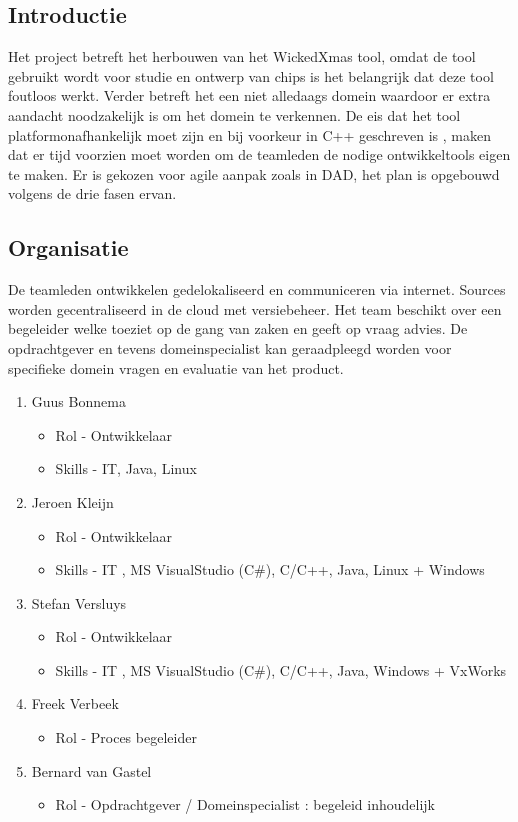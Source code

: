 
\subsection{Introductie}
Het project betreft het herbouwen van het WickedXmas tool, omdat de tool gebruikt wordt voor studie
en ontwerp van chips is het belangrijk dat deze tool foutloos werkt. Verder betreft het een niet
alledaags domein waardoor er extra aandacht noodzakelijk is om het domein te verkennen. De eis dat
het tool platformonafhankelijk moet zijn en bij voorkeur in C++ geschreven is , maken dat er tijd
voorzien moet worden om de teamleden de nodige ontwikkeltools eigen te maken.
Er is gekozen voor agile aanpak zoals in DAD, het plan is opgebouwd volgens de
drie fasen ervan.

\subsection{Organisatie}
 De teamleden ontwikkelen gedelokaliseerd en communiceren via internet. Sources worden gecentraliseerd
 in de cloud met versiebeheer. Het team beschikt over een begeleider welke toeziet op de gang van zaken
 en geeft op vraag advies. De opdrachtgever en tevens domeinspecialist kan geraadpleegd worden voor
 specifieke domein vragen en evaluatie van het product.
 \begin{enumerate}
 	\item Guus Bonnema
 	\begin{itemize}
		\item Rol - Ontwikkelaar
		\item Skills - IT, Java, Linux
	\end{itemize}
 	\item Jeroen Kleijn
 	\begin{itemize}
		\item Rol - Ontwikkelaar
		\item Skills - IT , MS VisualStudio (C\#), C/C++, Java, Linux + Windows
	\end{itemize}
 	\item Stefan Versluys
 	\begin{itemize}
		\item Rol - Ontwikkelaar
		\item Skills - IT , MS VisualStudio (C\#), C/C++, Java, Windows + VxWorks
	\end{itemize}
	\item Freek Verbeek
	\begin{itemize}
		\item Rol - Proces begeleider
	\end{itemize}
	\item Bernard van Gastel
	\begin{itemize}
		\item Rol - Opdrachtgever / Domeinspecialist : begeleid inhoudelijk
	\end{itemize}

 \end{enumerate}

